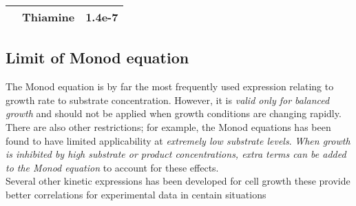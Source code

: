 \documentclass["EB-Notebook.tex"]{subfiles}
\begin{document}
\begin{sectionBox}
\begin{center}
\begin{tabular}{>{\itshape}l l S}
      \\[1ex]  
      & Thiamine & 1.4e-7

      \\\bottomrule
    \end{tabular}
    \vspace{2ex}
  \end{center}


  \subsection*{Limit of Monod equation}
  The Monod equation is by far the most frequently used expression relating to growth rate to substrate concentration. However, it is \emph{valid only for balanced growth} and should not be applied when growth conditions are changing rapidly. There are also other restrictions; for example, the Monod equations has been found to have limited applicability at \emph{extremely low substrate levels}. \emph{When growth is inhibited by high substrate or product concentrations, extra terms can be added to the Monod equation} to account for these effects.\\
  Several other kinetic expressions has been developed for cell growth these provide better correlations for experimental data in centain situations
\end{sectionBox}

\setcounter{subpart}{9}
\end{document}
